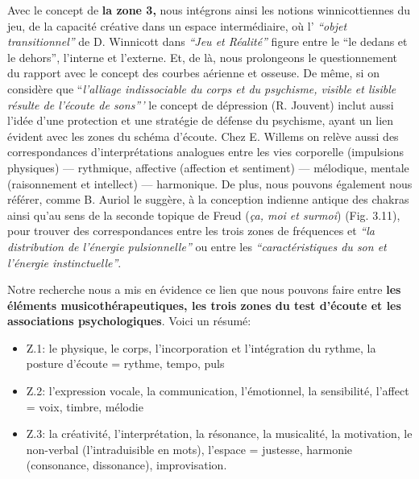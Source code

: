 Avec le concept de \textbf{la zone 3,} nous intégrons ainsi les notions winnicottiennes du jeu, de la 
capacité
créative dans un espace
intermédiaire, où l' \textit{``objet
	transitionnel'' } de D. Winnicott dans \textit{``Jeu et Réalité''}
\autocite{winnicott}
figure entre le ``le
dedans et le
dehors'',
l'interne et l'externe.  Et, de là, nous prolongeons le questionnement du
rapport avec le concept des
courbes aérienne et osseuse.
De même, si on considère que ``\emph{l'alliage indissociable du corps et du psychisme,
	visible et lisible résulte de l'écoute de
	sons'''}\autocite{tomatis_conf1972}
	 le concept de dépression (R. Jouvent) \autocite{doronparot}  inclut aussi l'idée d'une protection et 
	 une stratégie de
défense du psychisme, ayant un lien évident avec les zones du schéma d'écoute.
Chez E. Willems \autocite{willems} 
on relève aussi des correspondances d'interprétations 
	analogues entre les vies
corporelle (impulsions physiques)
--- rythmique, affective (affection et sentiment) --- mélodique, mentale
(raisonnement et intellect) --- harmonique.
     De plus, nous pouvons également nous référer, comme B. Auriol le suggère, à la conception indienne 
     antique des chakras
ainsi qu'au sens de la seconde
topique de Freud (\textit{ça, moi et surmoi}) (Fig. 3.11), pour trouver des correspondances
entre les trois zones de
fréquences et \textit {``la distribution de l'énergie pulsionnelle''} ou entre
les
\textit{``caractéristiques du son et l'énergie
	instinctuelle''}\autocite[ch. 13]{auriol:cle}.

Notre recherche nous a mis en évidence ce lien que nous pouvons faire entre 
\textbf{ les éléments musicothérapeutiques, les trois zones du
	test d'écoute et les associations psychologiques}. 
Voici un résumé: 
\begin{itemize}
	\item  Z.1: le physique, le corps, l'incorporation et
	l'intégration du rythme,
	la posture d'écoute  =  rythme, tempo, puls
	\item  Z.2:  l'expression vocale, la communication,
	l'émotionnel, la sensibilité, l'affect = voix, timbre, mélodie
	\item Z.3: la créativité, l'interprétation, la
	résonance, la musicalité, la motivation, le non-verbal (l'intraduisible en mots), l'espace = justesse, 
	harmonie (consonance,
	dissonance), improvisation.

\end{itemize}

